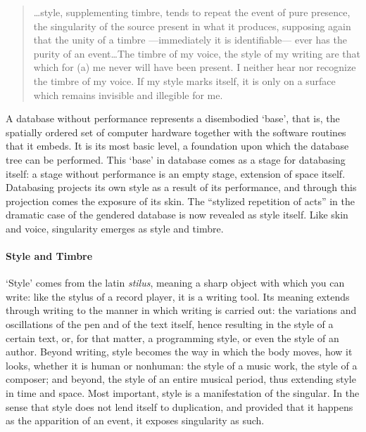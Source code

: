 \begin{quote}
	\dots style, supplementing timbre, tends to repeat the event of pure presence, the singularity of the source present in what it produces, supposing again that the unity of a timbre ---immediately it is identifiable--- ever has the purity of an event\dots The timbre of my voice, the style of my writing are that which for (a) me never will have been present. I neither hear nor recognize the timbre of my voice. If my style marks itself, it is only on a surface which remains invisible and illegible for me. \parencite[296]{Der82:Mar}

\end{quote}

A database without performance represents a disembodied `base', that is, the spatially ordered set of computer hardware together with the software routines that it embeds. It is its most basic level, a foundation upon which the database tree can be performed. This `base' in database comes as a stage for databasing itself: a stage without performance is an empty stage, extension of space itself. Databasing projects its own style as a result of its performance, and through this projection comes the exposure of its skin. The ``stylized repetition of acts''  \parencite[519]{But88:Per} in the dramatic case of the gendered database is now revealed as style itself. Like skin and voice, singularity emerges as style and timbre.

\paragraph{Style and Timbre}
`Style' comes from the latin \textit{stilus}, meaning a sharp object with which you can write: like the stylus of a record player, it is a writing tool. Its meaning extends through writing to the manner in which writing is carried out: the variations and oscillations of the pen and of the text itself, hence resulting in the style of a certain text, or, for that matter, a programming style, or even the style of an author. Beyond writing, style becomes the way in which the body moves, how it looks, whether it is human or nonhuman: the style of a music work, the style of a composer; and beyond, the style of an entire musical period, thus extending style in time and space. Most important, style is a manifestation of the singular. In the sense that style does not lend itself to duplication, and provided that it happens as the apparition of an event, it exposes singularity as such. 

